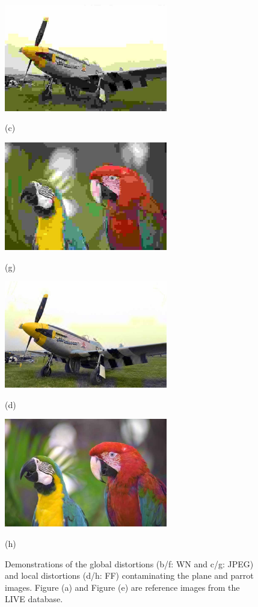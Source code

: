 \begin{figure}[!]
		\begin{minipage}[t]{.49\linewidth}
			\includegraphics[width=2.8in]{LIVE/JPEG/img201.jpg}
			\centerline{(c)}
		\end{minipage}
		\begin{minipage}[t]{.49\linewidth}
			\includegraphics[width=2.8in]{LIVE/JPEG/img233.jpg}
			\centerline{(g)}
		\end{minipage}
	
		\begin{minipage}[t]{.49\linewidth}
			\includegraphics[width=2.8in]{LIVE/FF/img56.jpg}
			\centerline{(d)}
		\end{minipage}
		\begin{minipage}[t]{.49\linewidth}
			\includegraphics[width=2.8in]{LIVE/FF/img44.jpg}
			\centerline{(h)}
		\end{minipage}
		
		\caption{Demonstrations of the global distortions (b/f: WN and c/g: JPEG) and local distortions (d/h: FF) contaminating the plane and parrot images. Figure (a) and Figure (e) are reference images from the LIVE database.}
		\label{LIVE-Distortion-1}
	\end{figure}
